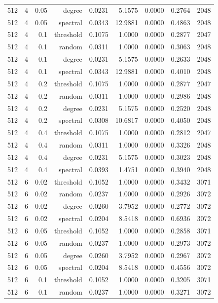 \begin{table}[t]
\begin{tabular}{lrrrrrrrr}
512 & 4 & 0.05 & degree & 0.0231 & 5.1575 & 0.0000 & 0.2764 & 2048 \\
512 & 4 & 0.05 & spectral & 0.0343 & 12.9881 & 0.0000 & 0.4863 & 2048 \\
512 & 4 & 0.1 & threshold & 0.1075 & 1.0000 & 0.0000 & 0.2877 & 2047 \\
512 & 4 & 0.1 & random & 0.0311 & 1.0000 & 0.0000 & 0.3063 & 2048 \\
512 & 4 & 0.1 & degree & 0.0231 & 5.1575 & 0.0000 & 0.2633 & 2048 \\
512 & 4 & 0.1 & spectral & 0.0343 & 12.9881 & 0.0000 & 0.4010 & 2048 \\
512 & 4 & 0.2 & threshold & 0.1075 & 1.0000 & 0.0000 & 0.2877 & 2047 \\
512 & 4 & 0.2 & random & 0.0311 & 1.0000 & 0.0000 & 0.2986 & 2048 \\
512 & 4 & 0.2 & degree & 0.0231 & 5.1575 & 0.0000 & 0.2520 & 2048 \\
512 & 4 & 0.2 & spectral & 0.0308 & 10.6817 & 0.0000 & 0.4050 & 2048 \\
512 & 4 & 0.4 & threshold & 0.1075 & 1.0000 & 0.0000 & 0.2812 & 2047 \\
512 & 4 & 0.4 & random & 0.0311 & 1.0000 & 0.0000 & 0.3326 & 2048 \\
512 & 4 & 0.4 & degree & 0.0231 & 5.1575 & 0.0000 & 0.3023 & 2048 \\
512 & 4 & 0.4 & spectral & 0.0393 & 1.4751 & 0.0000 & 0.3940 & 2048 \\
512 & 6 & 0.02 & threshold & 0.1052 & 1.0000 & 0.0000 & 0.3432 & 3071 \\
512 & 6 & 0.02 & random & 0.0237 & 1.0000 & 0.0000 & 0.2926 & 3072 \\
512 & 6 & 0.02 & degree & 0.0260 & 3.7952 & 0.0000 & 0.2772 & 3072 \\
512 & 6 & 0.02 & spectral & 0.0204 & 8.5418 & 0.0000 & 0.6936 & 3072 \\
512 & 6 & 0.05 & threshold & 0.1052 & 1.0000 & 0.0000 & 0.2858 & 3071 \\
512 & 6 & 0.05 & random & 0.0237 & 1.0000 & 0.0000 & 0.2973 & 3072 \\
512 & 6 & 0.05 & degree & 0.0260 & 3.7952 & 0.0000 & 0.2967 & 3072 \\
512 & 6 & 0.05 & spectral & 0.0204 & 8.5418 & 0.0000 & 0.4556 & 3072 \\
512 & 6 & 0.1 & threshold & 0.1052 & 1.0000 & 0.0000 & 0.3205 & 3071 \\
512 & 6 & 0.1 & random & 0.0237 & 1.0000 & 0.0000 & 0.3271 & 3072 \\

\end{tabular}
\end{table}
